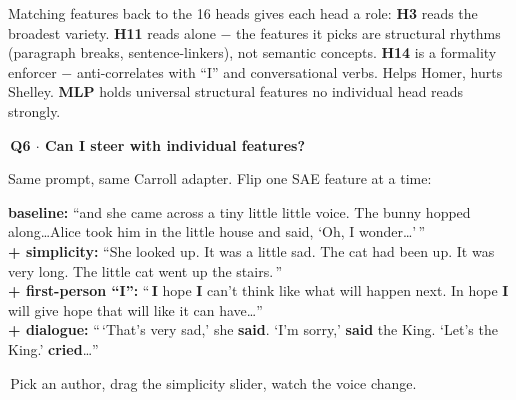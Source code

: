 \documentclass[a0,landscape]{a0poster}
\newcommand{\qtitle}[1]{{\Large\bfseries\color{accBlack}#1}\par\medskip}
\newcommand{\qlabel}[1]{{\normalfont\bfseries\color{accBlack}#1}}
\newcommand{\demo}{\raisebox{1pt}{\color{accBlue}$\blacktriangleright$}\,}
\begin{document}
\begin{minipage}[t][\textheight][t]{\textwidth}
\begin{minipage}[t]{0.29\textwidth}
\begin{qpanel}[accGreen]
    Matching features back to the 16 heads gives each head a role:
    {\color{accGreen}\textbf{H3}} reads the broadest variety.
    {\color{accBlue}\textbf{H11}} reads alone $-$ the features it picks are structural rhythms (paragraph breaks, sentence-linkers), not semantic concepts.
    {\color{accRed}\textbf{H14}} is a formality enforcer $-$ anti-correlates with ``I'' and conversational verbs. Helps Homer, hurts Shelley.
    {\color{accOrange}\textbf{MLP}} holds universal structural features no individual head reads strongly.
  \end{qpanel}

  \vspace{6mm}

  \begin{qpanel}[accPurple]
    \qtitle{\demo Q6 $\cdot$ Can I steer with individual features?}
    Same prompt, same Carroll adapter. Flip one SAE feature at a time:
    \begin{quotebox}
      \qlabel{baseline:} ``and she came across a tiny little little voice. The bunny hopped along\ldots Alice took him in the little house and said, `Oh, I wonder\ldots'\,''\\[1mm]
      \qlabel{\color{featTeal}+ simplicity:} ``She looked up{\color{featTeal}.} It was a little sad{\color{featTeal}.} The cat had been up{\color{featTeal}.} It was very long{\color{featTeal}.} The little cat went up the stairs{\color{featTeal}.}\,''\\[1mm]
      \qlabel{\color{featPink}+ first-person ``I'':} ``\,{\color{featPink}\textbf{I}} hope {\color{featPink}\textbf{I}} can't think like what will happen next. In hope {\color{featPink}\textbf{I}} will give hope that will like it can have\ldots''\\[1mm]
      \qlabel{\color{featAmber}+ dialogue:} ``\,`That's very sad,' she {\color{featAmber}\textbf{said}}. `I'm sorry,' {\color{featAmber}\textbf{said}} the King. `Let's the King.' {\color{featAmber}\textbf{cried}}\ldots''
    \end{quotebox}

    \vspace{2mm}
    \begin{tcolorbox}[enhanced, arc=2mm,
      colback=highlightBg, colframe=highlightBg, boxrule=0pt,
      left=4mm, right=4mm, top=1.5mm, bottom=1.5mm,
      before skip=0mm, after skip=0mm]
      {\normalsize\demo Pick an author, drag the simplicity slider, watch the voice change.}
    \end{tcolorbox}
  \end{qpanel}


\end{minipage}
\end{minipage}
\end{document}
